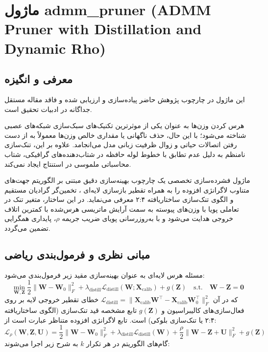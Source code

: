\section{ماژول admm\_pruner (ADMM Pruner with Distillation and Dynamic Rho)}
\label{sec:module_admm_pruner}

\subsection{معرفی و انگیزه}
این ماژول در چارچوب پژوهش حاضر پیاده‌سازی و ارزیابی شده و فاقد مقاله مستقل جداگانه در ادبیات تحقیق است.

هرس کردن وزن‌ها  به عنوان یکی از موثرترین تکنیک‌های سبک‌سازی شبکه‌های عصبی شناخته می‌شود؛ با این حال، حذف ناگهانی یا مقداری خالص وزن‌ها  معمولاً به از دست رفتن اتصالات حیاتی و زوال ظرفیت زبانی مدل می‌انجامد. علاوه بر این، تنک‌سازی نامنظم  به دلیل عدم تطابق با خطوط لوله حافظه در شتاب‌دهنده‌های گرافیکی، شتاب محاسباتی ملموسی در استنتاج ایجاد نمی‌کند.

ماژول فشرده‌سازی تخصصی  یک چارچوب بهینه‌سازی دقیق مبتنی بر الگوریتم جهت‌های متناوب لاگرانژی افزوده  را به همراه تقطیر بازسازی لایه‌ای ، تخمین‌گر گرادیان مستقیم  و الگوی تنک‌سازی ساختاریافته ۲:۴ معرفی می‌نماید. در این ساختار، متغیر تنک در تعاملی پویا با وزن‌های پیوسته به سمت آرایش ماتریسی هرس‌شده با کمترین اتلاف خروجی هدایت می‌شود و با به‌روزرسانی پویای ضریب جریمه $\rho$، پایداری همگرایی تضمین می‌گردد.

\subsection{مبانی نظری و فرمول‌بندی ریاضی}
مسئله هرس لایه‌ای به عنوان بهینه‌سازی مقید زیر فرمول‌بندی می‌شود:
\begin{equation}
\min_{\mathbf{W}, \mathbf{Z}} \frac{1}{2} \|\mathbf{W} - \mathbf{W}_0\|_F^2 + \lambda_{\text{distill}} \mathcal{L}_{\text{distill}}(\mathbf{W}; \mathbf{X}_{\text{calib}}) + g(\mathbf{Z}) \quad \text{s.t.} \quad \mathbf{W} - \mathbf{Z} = \mathbf{0}
\end{equation}
که در آن $\mathcal{L}_{\text{distill}} = \|\mathbf{X}_{\text{calib}} \mathbf{W}^\top - \mathbf{X}_{\text{calib}} \mathbf{W}_0^\top\|_F^2$ خطای تقطیر خروجی لایه بر روی فعال‌سازی‌های کالیبراسیون و $g(\mathbf{Z})$ تابع مشخصه قید تنک‌سازی (الگوی ساختاریافته ۲:۴ یا تنک‌سازی بلوکی) است. تابع لاگرانژی افزوده متناظر عبارت است از:
\begin{equation}
\mathcal{L}_{\rho}(\mathbf{W}, \mathbf{Z}, \mathbf{U}) = \frac{1}{2} \|\mathbf{W} - \mathbf{W}_0\|_F^2 + \lambda_{\text{distill}} \mathcal{L}_{\text{distill}}(\mathbf{W}) + \frac{\rho}{2} \|\mathbf{W} - \mathbf{Z} + \mathbf{U}\|_F^2 + g(\mathbf{Z})
\end{equation}
گام‌های الگوریتم در هر تکرار $k$ به شرح زیر اجرا می‌شوند:

